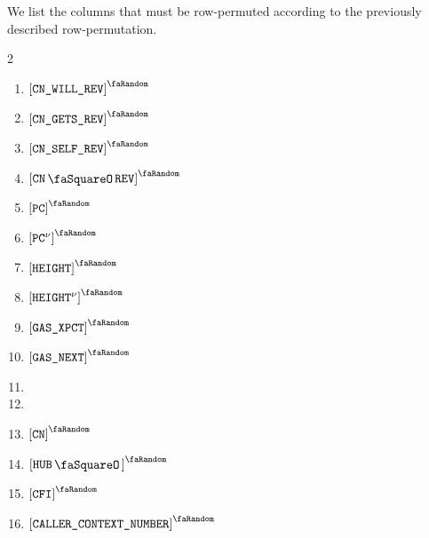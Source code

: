 We list the columns that must be row-permuted according to the previously described row-permutation.
\begin{multicols}{2}
	\begin{enumerate}
		\item $\order{\cnWillRev}$
		\item $\order{\cnGetsRev}$
		\item $\order{\cnSelfRev}$
		\item $\order{\cnRevStamp}$
		\item $\order{\pc}$
		\item $\order{\pc\new}$
		\item $\order{\height}$
		\item $\order{\height\new}$
		\item $\order{\gasExpected}$
		\item $\order{\gasNext}$
		\item[\vspace{\fill}]
		\item[\vspace{\fill}]
		\item $\order{\cn}$
		\item $\order{\hubStamp}$
		\item $\order{\cfi}$
		\item $\order{\caller}$
	\end{enumerate}
\end{multicols}

